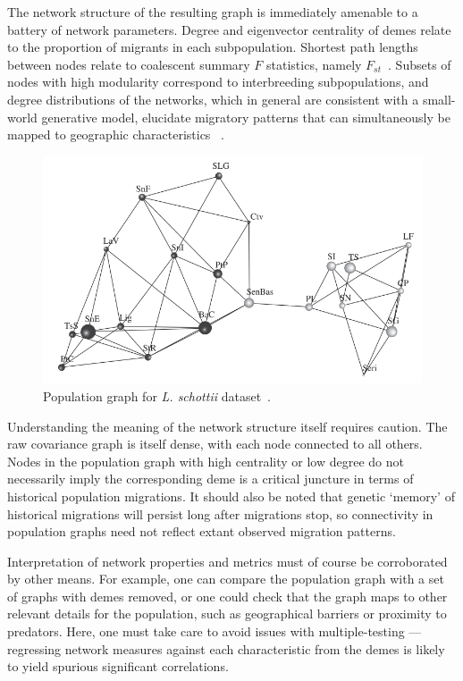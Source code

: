 \documentclass{essay}
\begin{document}
The network structure of the resulting graph is immediately amenable to a
battery of network parameters. Degree and eigenvector centrality of demes
relate to the proportion of migrants in each subpopulation. Shortest path
lengths between nodes relate to coalescent summary $F$ statistics, namely
$F_{st}$~\cite{dyer_population_2004}. Subsets of nodes with high modularity
correspond to interbreeding subpopulations, and degree distributions of the
networks, which in general are consistent with a small-world generative model,
elucidate migratory patterns that can simultaneously be mapped to geographic
characteristics ~\cite{garroway_applications_2008}.

\begin{figure}
  \includegraphics[width=\linewidth,keepaspectratio]{../Figures/fig4.png}
  \caption{Population graph for \textit{L. schottii} dataset~\cite{dyer_population_2004}.}
\end{figure}

Understanding the meaning of the network structure itself requires caution.
The raw covariance graph is itself dense, with each node connected to all
others. Nodes in the population graph with high centrality or low degree do not
necessarily imply the corresponding deme is a critical juncture in terms of
historical population migrations. It should also be noted that genetic `memory'
of historical migrations will persist long after migrations stop, so
connectivity in population graphs need not reflect extant observed migration
patterns.

Interpretation of network properties and metrics must of course be corroborated
by other means. For example, one can compare the population graph with a set of
graphs with demes removed, or one could check that the graph maps to other
relevant details for the population, such as geographical barriers or proximity
to predators. Here, one must take care to avoid issues with multiple-testing
--- regressing network measures against each characteristic from the demes is
likely to yield spurious significant correlations.
\end{document}
